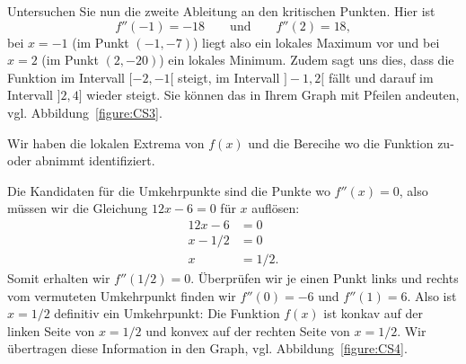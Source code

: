 Untersuchen Sie nun die zweite Ableitung an den kritischen Punkten. Hier ist
\[
f''(-1) = -18 \qquad\text{und}\qquad f''(2) = 18,
\]
bei $x=-1$ (im Punkt $(-1,-7)$) liegt also ein lokales Maximum vor und bei $x=2$ (im Punkt $(2,-20)$) ein lokales Minimum.
Zudem sagt uns dies, dass die Funktion im Intervall 
$[-2,-1[$ steigt, im Intervall $]-1,2[$ fällt und darauf im Intervall  $]2,4]$ wieder steigt. Sie können das in Ihrem Graph mit Pfeilen andeuten, vgl. Abbildung~\ref{figure:CS3}.
\begin{marginfigure}[0in]
\caption{Wir haben die lokalen Extrema von $f(x)$ und die Berecihe wo die Funktion zu- oder abnimmt identifiziert.}
\label{figure:CS3}
\end{marginfigure}

Die Kandidaten für die Umkehrpunkte sind die Punkte wo $f''(x) = 0$, also müssen wir die Gleichung $12x-6=0$ für $x$ auflösen:
\begin{align*}
12x-6 &=0\\
x - 1/2 &=0\\
x &=1/2.
\end{align*}
Somit erhalten wir $f''(1/2) = 0$. Überprüfen wir je einen Punkt links und rechts vom vermuteten Umkehrpunkt finden wir $f''(0) = -6$ und $f''(1) = 6$.
Also ist $x=1/2$ definitiv ein Umkehrpunkt: Die Funktion $f(x)$ ist konkav auf der linken Seite von $x=1/2$ und konvex auf der rechten Seite von $x=1/2$. Wir übertragen diese Information in den Graph, vgl. Abbildung~\ref{figure:CS4}.

